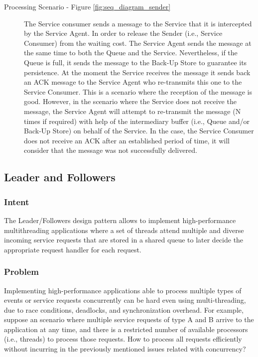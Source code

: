 \begin{description}
	
	\item[Processing Scenario - Figure \ref{fig:seq_diagram_sender}]
	The Service consumer sends a message to the Service that it is intercepted by the Service Agent. In order to release the Sender (i.e., Service Consumer) from the waiting cost. The Service Agent sends the message at the same time to both the Queue and the Service. Nevertheless, if the Queue is full, it sends the message to the Back-Up Store to guarantee its persistence. At the moment the Service receives the message it sends back an ACK message to the Service Agent who re-transmits this one to the Service Consumer. This is a scenario where the reception of the message is good. However, in the scenario where the Service does not receive the message, the Service Agent will attempt to re-transmit the message (N times if required) with help of the intermediary buffer (i.e., Queue and/or Back-Up Store) on behalf of the Service. In the case, the Service Consumer does not receive an ACK after an established period of time, it will consider that the message was not successfully delivered.
	
	
\end{description}

\subsection{Leader and Followers}

\subsubsection{Intent}

The Leader/Followers design pattern allows to implement high-performance multithreading applications where a set of threads attend multiple and diverse incoming service requests that are stored in a shared queue to later decide the appropriate request handler for each request. 

\subsubsection{Problem}

Implementing high-performance applications able to process multiple types of events or service requests concurrently can be hard even using multi-threading, due to race conditions, deadlocks, and synchronization overhead. For example, suppose an scenario where multiple service requests of type A and B arrive to the application at any time, and there is a restricted number of available processors (i.e., threads) to process those requests. How to process all requests efficiently without incurring in the previously mentioned issues related with concurrency?  

